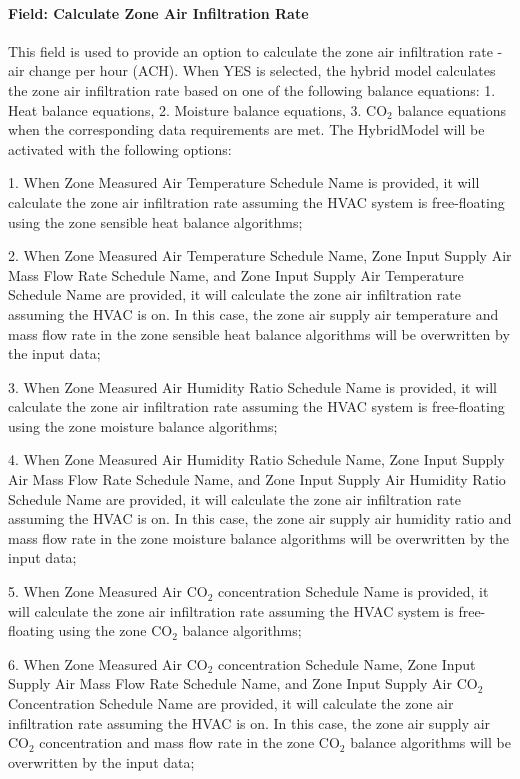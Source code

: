 \paragraph{Field: Calculate Zone Air Infiltration Rate}\label{field-calculate-zone-air-infiltration-rate-hm}

This field is used to provide an option to calculate the zone air infiltration rate - air change per hour (ACH).
When YES is selected, the hybrid model calculates the zone air infiltration rate based on one of the following balance equations: 1. Heat balance equations, 2. Moisture balance equations, 3. CO$_2$ balance equations when the corresponding data requirements are met. The HybridModel will be activated with the following options:

1. When Zone Measured Air Temperature Schedule Name is provided, it will calculate the zone air infiltration rate assuming the HVAC system is free-floating using the zone sensible heat balance algorithms;

2. When Zone Measured Air Temperature Schedule Name, Zone Input Supply Air Mass Flow Rate Schedule Name, and Zone Input Supply Air Temperature Schedule Name are provided, it will calculate the zone air infiltration rate assuming the HVAC is on. In this case, the zone air supply air temperature and mass flow rate in the zone sensible heat balance algorithms will be overwritten by the input data;

3. When Zone Measured Air Humidity Ratio Schedule Name is provided, it will calculate the zone air infiltration rate assuming the HVAC system is free-floating using the zone moisture balance algorithms;

4. When Zone Measured Air Humidity Ratio Schedule Name, Zone Input Supply Air Mass Flow Rate Schedule Name, and Zone Input Supply Air Humidity Ratio Schedule Name are provided, it will calculate the zone air infiltration rate assuming the HVAC is on. In this case, the zone air supply air humidity ratio and mass flow rate in the zone moisture balance algorithms will be overwritten by the input data;

5. When Zone Measured Air CO$_2$ concentration Schedule Name is provided, it will calculate the zone air infiltration rate assuming the HVAC system is free-floating using the zone CO$_2$ balance algorithms;

6. When Zone Measured Air CO$_2$ concentration Schedule Name, Zone Input Supply Air Mass Flow Rate Schedule Name, and Zone Input Supply Air CO$_2$ Concentration Schedule Name are provided, it will calculate the zone air infiltration rate assuming the HVAC is on. In this case, the zone air supply air CO$_2$ concentration and mass flow rate in the zone CO$_2$ balance algorithms will be overwritten by the input data;

